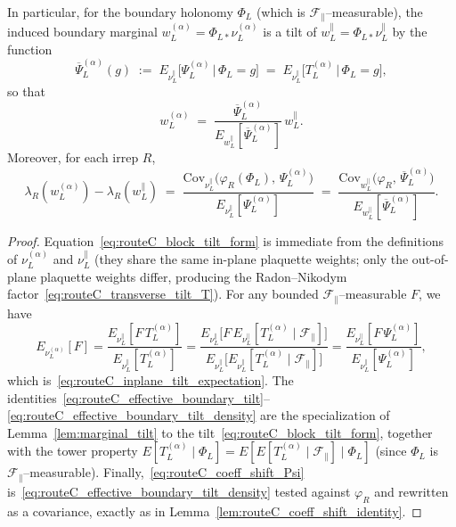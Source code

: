 \begin{lemma}
In particular, for the boundary holonomy $\Phi_L$ (which is $\mathscr F_{\parallel}$--measurable), the induced boundary marginal $w_L^{(\alpha)}=\Phi_{L\ast}\nu_L^{(\alpha)}$ is a tilt of $w_L^{\parallel}=\Phi_{L\ast}\nu_L^{\parallel}$ by the function
\begin{equation}\label{eq:routeC_effective_boundary_tilt}
\overline\Psi_L^{(\alpha)}(g)\;:=\;E_{\nu_L^{\parallel}}\!\big[\Psi_L^{(\alpha)} \,\big|\, \Phi_L=g\big]
\;=\;E_{\nu_L^{\parallel}}\!\big[T_L^{(\alpha)} \,\big|\, \Phi_L=g\big],
\end{equation}
so that
\begin{equation}\label{eq:routeC_effective_boundary_tilt_density}
w_L^{(\alpha)} \;=\; \frac{\overline\Psi_L^{(\alpha)}}{E_{w_L^{\parallel}}[\overline\Psi_L^{(\alpha)}]}\, w_L^{\parallel}.
\end{equation}
Moreover, for each irrep $R$,
\begin{equation}\label{eq:routeC_coeff_shift_Psi}
\lambda_R(w_L^{(\alpha)})-\lambda_R(w_L^{\parallel})
\;=\;\frac{\mathrm{Cov}_{\nu_L^{\parallel}}\!\big(\varphi_R(\Phi_L),\, \Psi_L^{(\alpha)}\big)}{E_{\nu_L^{\parallel}}[\Psi_L^{(\alpha)}]}
\;=\;\frac{\mathrm{Cov}_{w_L^{\parallel}}\!\big(\varphi_R,\, \overline\Psi_L^{(\alpha)}\big)}{E_{w_L^{\parallel}}[\overline\Psi_L^{(\alpha)}]}.
\end{equation}
\end{lemma}

\begin{proof}
Equation~\eqref{eq:routeC_block_tilt_form} is immediate from the definitions of $\nu_L^{(\alpha)}$ and $\nu_L^{\parallel}$ (they share the same in-plane plaquette weights; only the out-of-plane plaquette weights differ, producing the Radon--Nikodym factor~\eqref{eq:routeC_transverse_tilt_T}).
For any bounded $\mathscr F_{\parallel}$--measurable $F$, we have
\[
E_{\nu_L^{(\alpha)}}[F]
=\frac{E_{\nu_L^{\parallel}}[F\,T_L^{(\alpha)}]}{E_{\nu_L^{\parallel}}[T_L^{(\alpha)}]}
=\frac{E_{\nu_L^{\parallel}}\!\big[F\,E_{\nu_L^{\parallel}}[T_L^{(\alpha)}\mid\mathscr F_{\parallel}]\big]}
 {E_{\nu_L^{\parallel}}\!\big[E_{\nu_L^{\parallel}}[T_L^{(\alpha)}\mid\mathscr F_{\parallel}]\big]}
=\frac{E_{\nu_L^{\parallel}}[F\,\Psi_L^{(\alpha)}]}{E_{\nu_L^{\parallel}}[\Psi_L^{(\alpha)}]},
\]
which is~\eqref{eq:routeC_inplane_tilt_expectation}.
The identities~\eqref{eq:routeC_effective_boundary_tilt}--\eqref{eq:routeC_effective_boundary_tilt_density} are the specialization of Lemma~\ref{lem:marginal_tilt} to the tilt~\eqref{eq:routeC_block_tilt_form}, together with the tower property
$E[T_L^{(\alpha)}\mid \Phi_L]=E[E[T_L^{(\alpha)}\mid\mathscr F_{\parallel}]\mid \Phi_L]$ (since $\Phi_L$ is $\mathscr F_{\parallel}$--measurable).
Finally,~\eqref{eq:routeC_coeff_shift_Psi} is~\eqref{eq:routeC_effective_boundary_tilt_density} tested against $\varphi_R$ and rewritten as a covariance, exactly as in Lemma~\ref{lem:routeC_coeff_shift_identity}.
\end{proof}

